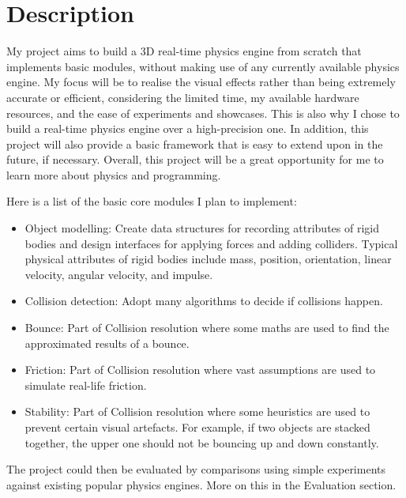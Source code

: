 \documentclass[12pt]{article}
\begin{document}
\section{Description}

My project aims to build a 3D real-time physics engine from scratch that implements basic modules, 
without making use of any currently available physics engine.
My focus will be to realise the visual effects rather than being extremely accurate or efficient,
considering the limited time, my available hardware resources, and the ease of experiments and showcases.
This is also why I chose to build a real-time physics engine over a high-precision one.
In addition, this project will also provide a basic framework that is easy to extend upon in the future, if necessary.
Overall, this project will be a great opportunity for me to learn more about physics and programming.

Here is a list of the basic core modules I plan to implement:
\begin{itemize}
\item Object modelling: Create data structures for recording attributes of rigid bodies and design interfaces for applying forces and adding colliders.
Typical physical attributes of rigid bodies include mass, position, orientation, linear velocity, angular velocity, and impulse.
\item Collision detection: Adopt many algorithms to decide if collisions happen.
\item Bounce: Part of Collision resolution where some maths are used to find the approximated results of a bounce.
\item Friction: Part of Collision resolution where vast assumptions are used to simulate real-life friction.
\item Stability: Part of Collision resolution where some heuristics are used to prevent certain visual artefacts.
For example, if two objects are stacked together, the upper one should not be bouncing up and down constantly.
\end{itemize}

The project could then be evaluated by comparisons using simple experiments against existing popular physics engines.
More on this in the Evaluation section.
\end{document}

